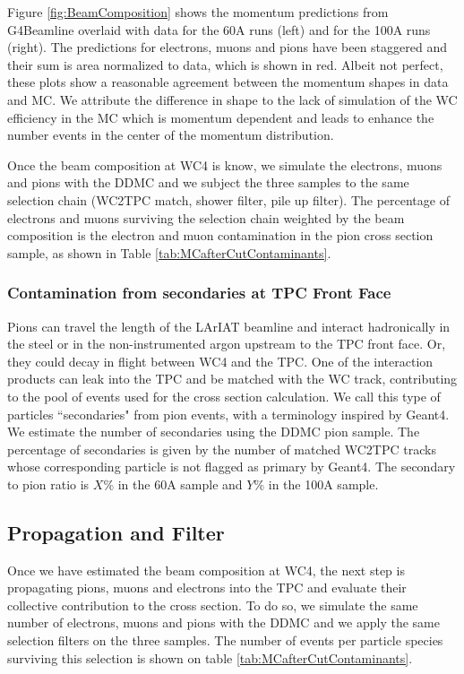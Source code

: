 Figure \ref{fig:BeamComposition} shows the momentum predictions from G4Beamline overlaid with data for the 60A runs (left) and for the 100A runs (right). The predictions for electrons, muons and pions have been staggered and their sum is area normalized to data, which is shown in red. Albeit not perfect, these plots show a reasonable agreement between the momentum shapes in data and MC. We attribute  the difference in shape to the lack of simulation of the WC efficiency in the MC which is momentum dependent and leads to enhance the number events in the center of the momentum distribution.

Once the beam composition at WC4 is know,  we simulate the electrons, muons and pions with the DDMC and we subject the three samples to the same selection chain (WC2TPC match, shower filter, pile up filter). The percentage of electrons and muons surviving the selection chain weighted by the beam composition is the  electron and muon contamination in the pion cross section sample, as shown in Table \ref{tab:MCafterCutContaminants}.

\subsubsection{Contamination from secondaries at TPC Front Face}
Pions can travel the length of the LArIAT beamline and interact hadronically in the steel or in the non-instrumented argon upstream to the TPC front face. Or, they could decay in flight between WC4 and the TPC. One of the interaction products can leak into the TPC and be matched with the WC track, contributing to the pool of events used for the cross section calculation. We call this type of particles ``secondaries" from pion events, with a terminology inspired by Geant4. 
We estimate the number of secondaries using the DDMC pion sample.  The percentage of secondaries is given by the number of matched WC2TPC tracks whose corresponding particle is not flagged as primary by Geant4.  The secondary to pion ratio is $X$\% in the 60A sample and $Y$\% in the 100A sample.

\subsection{Propagation and Filter}\label{sec:PropagationAndFilter}
Once we have estimated the beam composition at WC4, the next step is propagating pions, muons and electrons into the TPC and evaluate their collective contribution to the cross section. To do so, we simulate the same number of electrons, muons and pions with the DDMC and we apply the same selection filters on the three samples. The number of events per particle species surviving this selection is shown on table \ref{tab:MCafterCutContaminants}.

